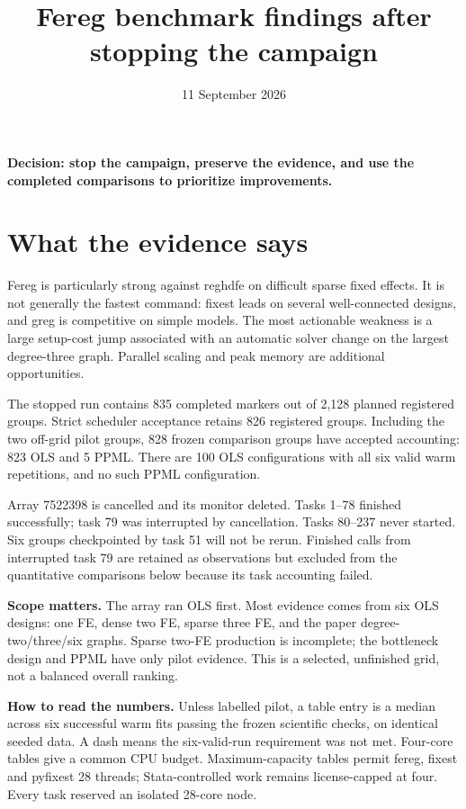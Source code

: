 \documentclass[11pt]{article}
\begin{document}
\title{Fereg benchmark findings after stopping the campaign}\author{}\date{11 September 2026}\maketitle

\textbf{Decision: stop the campaign, preserve the evidence, and use the completed comparisons to prioritize improvements.}

\section{What the evidence says}

Fereg is particularly strong against reghdfe on difficult sparse fixed effects. It is not generally the fastest command: fixest leads on several well-connected designs, and greg is competitive on simple models. The most actionable weakness is a large setup-cost jump associated with an automatic solver change on the largest degree-three graph. Parallel scaling and peak memory are additional opportunities.

The stopped run contains 835 completed markers out of 2,128 planned registered groups. Strict scheduler acceptance retains 826 registered groups. Including the two off-grid pilot groups, 828 frozen comparison groups have accepted accounting: 823 OLS and 5 PPML. There are 100 OLS configurations with all six valid warm repetitions, and no such PPML configuration.

Array 7522398 is cancelled and its monitor deleted. Tasks 1--78 finished successfully; task 79 was interrupted by cancellation. Tasks 80--237 never started. Six groups checkpointed by task 51 will not be rerun. Finished calls from interrupted task 79 are retained as observations but excluded from the quantitative comparisons below because its task accounting failed.

\textbf{Scope matters.} The array ran OLS first. Most evidence comes from six OLS designs: one FE, dense two FE, sparse three FE, and the paper degree-two/three/six graphs. Sparse two-FE production is incomplete; the bottleneck design and PPML have only pilot evidence. This is a selected, unfinished grid, not a balanced overall ranking.

\textbf{How to read the numbers.} Unless labelled pilot, a table entry is a median across six successful warm fits passing the frozen scientific checks, on identical seeded data. A dash means the six-valid-run requirement was not met. Four-core tables give a common CPU budget. Maximum-capacity tables permit fereg, fixest and pyfixest 28 threads; Stata-controlled work remains license-capped at four. Every task reserved an isolated 28-core node.
\end{document}
